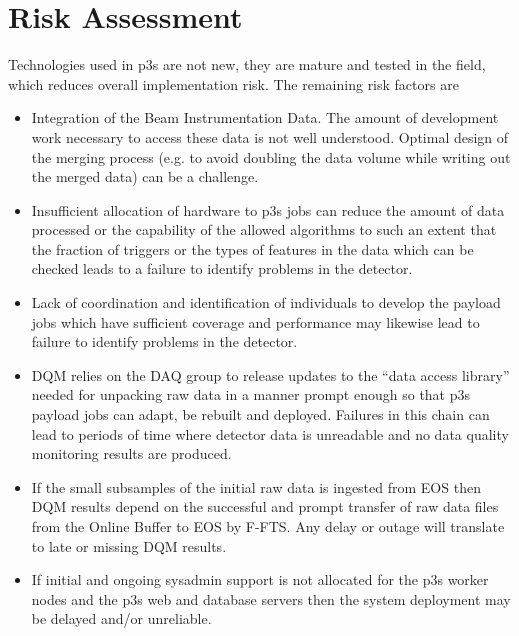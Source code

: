 \documentclass[pdftex,12pt,letter]{article}
\begin{document}
\section{Risk Assessment}
\label{sec:risk}

Technologies used in p3s are not new, they are mature and tested in the field, which reduces
overall implementation risk. The remaining risk factors are
\begin{itemize}

\item Integration of the Beam Instrumentation Data. The amount
of development work necessary to access these data is not well
understood. Optimal design of the merging process (e.g. to avoid
doubling the data volume while writing out the merged data)
can be a challenge.

\item Insufficient allocation of hardware to p3s jobs can reduce
  the amount of data processed or the capability of the allowed
  algorithms to such an extent that the fraction of triggers or the
  types of features in the data which can be checked leads to a
  failure to identify problems in the detector.

\item Lack of coordination and identification of individuals to
  develop the payload jobs which have sufficient coverage and
  performance may likewise lead to failure to identify problems in the
  detector.


\item DQM relies on the DAQ group to release updates to the ``data
  access library'' needed for unpacking raw data in a manner prompt
  enough so that p3s payload jobs can adapt, be rebuilt and deployed.
  Failures in this chain can lead to periods of time where detector
  data is unreadable and no data quality monitoring results are
  produced.

\item If the small subsamples of the initial raw data is ingested from
  EOS then DQM results depend on the successful and prompt transfer of
  raw data files from the Online Buffer to EOS by F-FTS.  Any delay or
  outage will translate to late or missing DQM results.

\item If initial and ongoing sysadmin support is
  not allocated for the p3s worker nodes and the
  p3s web and database servers then the system deployment
  may be delayed and/or unreliable.

\end{itemize}
\end{document}
